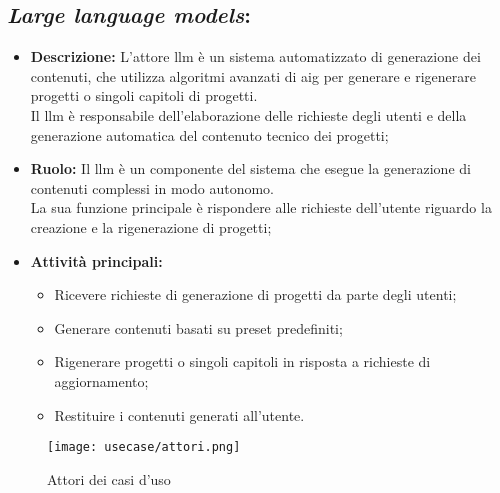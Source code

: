 \subsection*{\textit{Large language models}:}

\begin{itemize}
    \item \textbf{Descrizione:}  L'attore \gls{llm} è un sistema automatizzato di generazione dei contenuti, che utilizza algoritmi avanzati di \gls{aig} per generare e rigenerare progetti o singoli capitoli di progetti. \\
    Il \gls{llm} è responsabile dell'elaborazione delle richieste degli utenti e della generazione automatica del contenuto tecnico dei progetti;
    \item \textbf{Ruolo:}  Il \gls{llm} è un componente del sistema che esegue la generazione di contenuti complessi in modo autonomo.\\
    La sua funzione principale è rispondere alle richieste dell'utente riguardo la creazione e la rigenerazione di progetti;
    \item \textbf{Attività principali:}
        \begin{itemize}
            \item Ricevere richieste di generazione di progetti da parte degli utenti;
            \item Generare contenuti basati su preset predefiniti;
            \item Rigenerare progetti o singoli capitoli in risposta a richieste di aggiornamento;
            \item Restituire i contenuti generati all'utente.
        \end{itemize}
\end{itemize}

\begin{figure}[H]
    \centering
    \texttt{[image: usecase/attori.png]}
    \caption{Attori dei casi d'uso}
    \label{fig:attori-casi-duso}
\end{figure}



